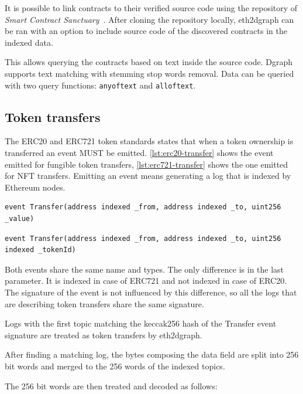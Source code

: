 It is possible to link contracts to their verified source code using the repository of \textit{Smart Contract Sanctuary}~\cite{smart_contract_sanctuary}. After cloning the repository locally, eth2dgraph can be ran with an option to include source code of the discovered contracts in the indexed data.

This allows querying the contracts based on text inside the source code. Dgraph supports text matching with stemming stop words removal. Data can be queried with two query functions: \texttt{anyoftext} and \texttt{alloftext}.

\subsection{Token transfers}

The ERC20 and ERC721 token standards states that when a token ownership is transferred an event MUST be emitted. \cref{lst:erc20-transfer} shows the event emitted for fungible token transfers, \cref{lst:erc721-transfer} shows the one emitted for NFT transfers. Emitting an event means generating a log that is indexed by Ethereum nodes.

\begin{lstlisting}[caption={Event emitted for ERC20 token transfer},label={lst:erc20-transfer},captionpos=b]
event Transfer(address indexed _from, address indexed _to, uint256 _value)
\end{lstlisting}

\begin{lstlisting}[caption={Event emitted for ERC721 token transfer},label={lst:erc721-transfer},captionpos=b]
event Transfer(address indexed _from, address indexed _to, uint256 indexed _tokenId)
\end{lstlisting}

Both events share the same name and types. The only difference is in the last parameter. It is indexed in case of ERC721 and not indexed in case of ERC20. The signature of the event is not influenced by this difference, so all the logs that are describing token transfers share the same signature.

Logs with the first topic matching the keccak256 hash of the Transfer event signature are treated as token transfers by eth2dgraph.

After finding a matching log, the bytes composing the data field are split into 256 bit words and merged to the 256 words of the indexed topics.

The 256 bit words are then treated and decoded as follows:

